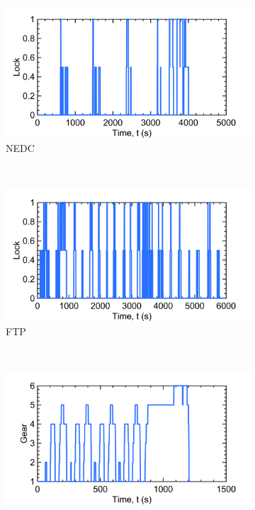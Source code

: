 \begin{figure}[ht]
  \centering
  \begin{subfigure}[b]{0.45\textwidth}
    \includegraphics[width=\textwidth]{figures/model/NEDC_plt_lockup.png}
    \caption{NEDC}
    \label{fig:NEDC_lockup}
  \end{subfigure}
  ~ %
  \begin{subfigure}[b]{0.45\textwidth}
    \includegraphics[width=\textwidth]{figures/model/FTP_plt_lockup.png}
    \caption{FTP}
    \label{fig:FTP_lockup}
  \end{subfigure}
  ~
  \begin{subfigure}[b]{0.45\textwidth}
    \includegraphics[width=\textwidth]{figures/model/NEDC_plt_gear.png}

\end{subfigure}
\end{figure}
